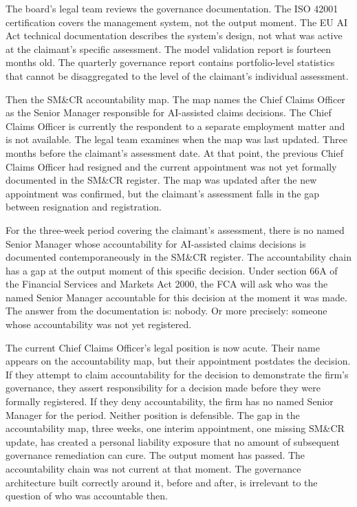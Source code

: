 The board's legal team reviews the governance documentation. The ISO 42001 certification covers the management system, not the output moment. The EU AI Act technical documentation describes the system's design, not what was active at the claimant's specific assessment. The model validation report is fourteen months old. The quarterly governance report contains portfolio-level statistics that cannot be disaggregated to the level of the claimant's individual assessment.

Then the SM\&CR accountability map. The map names the Chief Claims Officer as the Senior Manager responsible for AI-assisted claims decisions. The Chief Claims Officer is currently the respondent to a separate employment matter and is not available. The legal team examines when the map was last updated. Three months before the claimant's assessment date. At that point, the previous Chief Claims Officer had resigned and the current appointment was not yet formally documented in the SM\&CR register. The map was updated after the new appointment was confirmed, but the claimant's assessment falls in the gap between resignation and registration.

For the three-week period covering the claimant's assessment, there is no named Senior Manager whose accountability for AI-assisted claims decisions is documented contemporaneously in the SM\&CR register. The accountability chain has a gap at the output moment of this specific decision. Under section 66A of the Financial Services and Markets Act 2000, the FCA will ask who was the named Senior Manager accountable for this decision at the moment it was made. The answer from the documentation is: nobody. Or more precisely: someone whose accountability was not yet registered.

The current Chief Claims Officer's legal position is now acute. Their name appears on the accountability map, but their appointment postdates the decision. If they attempt to claim accountability for the decision to demonstrate the firm's governance, they assert responsibility for a decision made before they were formally registered. If they deny accountability, the firm has no named Senior Manager for the period. Neither position is defensible. The gap in the accountability map, three weeks, one interim appointment, one missing SM\&CR update, has created a personal liability exposure that no amount of subsequent governance remediation can cure. The output moment has passed. The accountability chain was not current at that moment. The governance architecture built correctly around it, before and after, is irrelevant to the question of who was accountable then.

